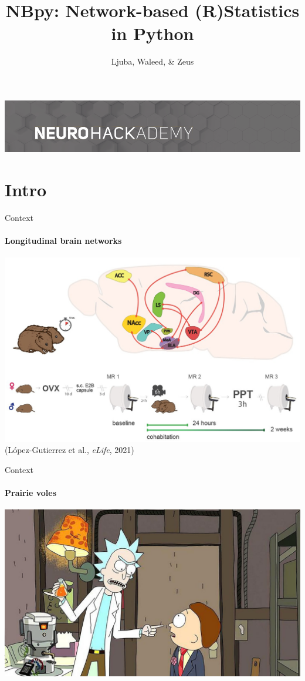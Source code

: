 \documentclass[english,aspectratio=169]{beamer}
\title[NBpy]{NBpy: Network-based (R)Statistics in Python}
\author[]{Ljuba, Waleed, \& Zeus}
\begin{document}
\begin{frame}%
  \titlepage

  \centering
  \vspace*{-0.5cm}
  \includegraphics[width=\textwidth]{neurohack.png}
\end{frame}

\section{Intro}

\begin{frame}{Context}%
  \framesubtitle{Longitudinal brain networks}
  
  \centering
  \includegraphics[width=.8\linewidth]{voles.jpg}\\[0.25cm]

  \raggedleft
  (López-Gutierrez et al., \textit{eLife}, 2021)

\end{frame}

\begin{frame}{Context}%
  \framesubtitle{Prairie voles}
  
  \centering
  \includegraphics[width=.8\linewidth]{rmvoles.jpeg}\\[0.25cm]

\end{frame}
\end{document}

